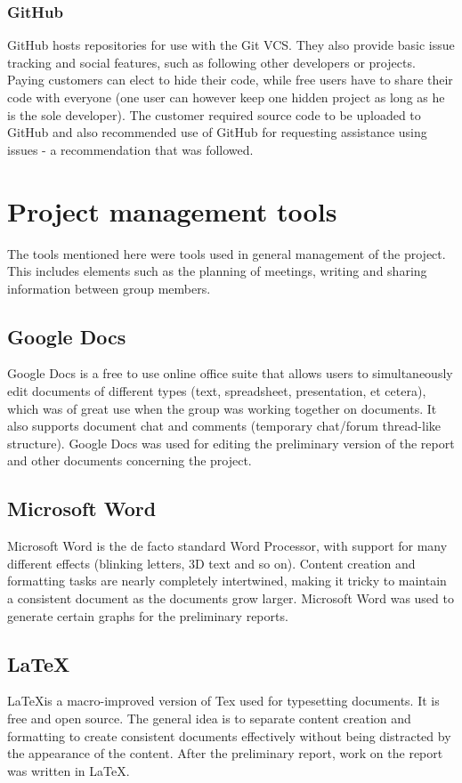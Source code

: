 \subsubsection{GitHub}
\label{sec:GitHub}
GitHub hosts repositories for use with the Git VCS. They also provide basic issue tracking and social features, such as following other developers or projects. Paying customers can elect to hide their code, while free users have to share their code with everyone (one user can however keep one hidden project as long as he is the sole developer). The customer required source code to be uploaded to GitHub and also recommended use of GitHub for requesting assistance using issues - a recommendation that was followed.

\section{Project management tools}
The tools mentioned here were tools used in general management of the project. This includes elements such as the planning of meetings, writing and sharing information between group members.

\subsection{Google Docs}
Google Docs is a free to use online office suite that allows users to simultaneously edit documents of different types (text, spreadsheet, presentation, et cetera), which was of great use when the group was working together on documents. It also supports document chat and comments (temporary chat/forum thread-like structure). Google Docs was used for editing the preliminary version of the report and other documents concerning the project.

\subsection{Microsoft Word}
Microsoft Word is the de facto standard Word Processor, with support for many different effects (blinking letters, 3D text and so on). Content creation and formatting tasks are nearly completely intertwined, making it tricky to maintain a consistent document as the documents grow larger. Microsoft Word was used to generate certain graphs for the preliminary reports.

\subsection{\LaTeX}
\LaTeX is a macro-improved version of Tex used for typesetting documents. It is free and open source. The general idea is to separate content creation and formatting to create consistent documents effectively without being distracted by the appearance of the content. After the preliminary report, work on the report was written in \LaTeX.

